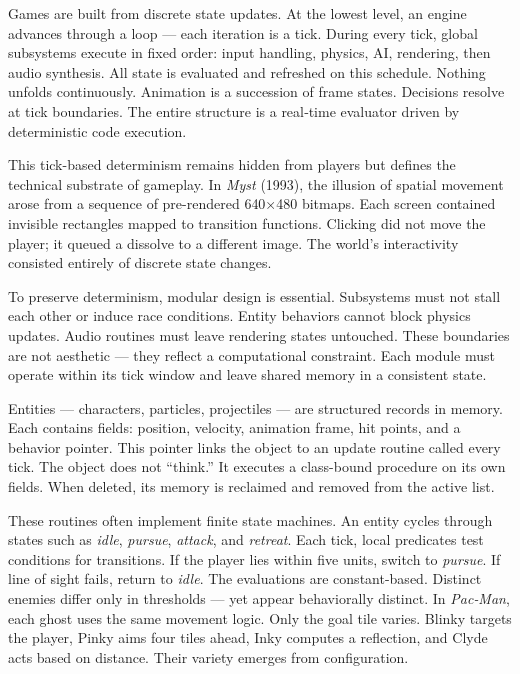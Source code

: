 Games are built from discrete state updates. At the lowest level, an engine advances through a loop — each iteration is a tick. During every tick, global subsystems execute in fixed order: input handling, physics, AI, rendering, then audio synthesis. All state is evaluated and refreshed on this schedule. Nothing unfolds continuously. Animation is a succession of frame states. Decisions resolve at tick boundaries. The entire structure is a real‑time evaluator driven by deterministic code execution.

This tick-based determinism remains hidden from players but defines the technical substrate of gameplay. In \emph{Myst} (1993), the illusion of spatial movement arose from a sequence of pre-rendered 640×480 bitmaps. Each screen contained invisible rectangles mapped to transition functions. Clicking did not move the player; it queued a dissolve to a different image. The world’s interactivity consisted entirely of discrete state changes.

To preserve determinism, modular design is essential. Subsystems must not stall each other or induce race conditions. Entity behaviors cannot block physics updates. Audio routines must leave rendering states untouched. These boundaries are not aesthetic — they reflect a computational constraint. Each module must operate within its tick window and leave shared memory in a consistent state.

Entities — characters, particles, projectiles — are structured records in memory. Each contains fields: position, velocity, animation frame, hit points, and a behavior pointer. This pointer links the object to an update routine called every tick. The object does not “think.” It executes a class-bound procedure on its own fields. When deleted, its memory is reclaimed and removed from the active list.

These routines often implement finite state machines. An entity cycles through states such as \emph{idle}, \emph{pursue}, \emph{attack}, and \emph{retreat}. Each tick, local predicates test conditions for transitions. If the player lies within five units, switch to \emph{pursue}. If line of sight fails, return to \emph{idle}. The evaluations are constant-based. Distinct enemies differ only in thresholds — yet appear behaviorally distinct. In \emph{Pac‑Man}, each ghost uses the same movement logic. Only the goal tile varies. Blinky targets the player, Pinky aims four tiles ahead, Inky computes a reflection, and Clyde acts based on distance. Their variety emerges from configuration.

